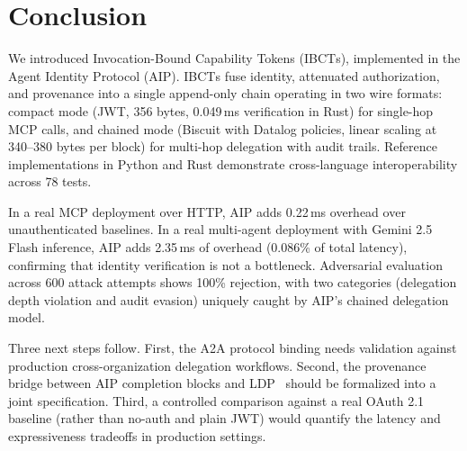 \documentclass[11pt,a4paper]{article}
\newcommand{\aip}{\textsc{AIP}}
\newcommand{\ibct}{\textsc{IBCT}}
\newcommand{\ldp}{\textsc{LDP}}
\newcommand{\atoa}{\textsc{A2A}}
\newcommand{\mcp}{\textsc{MCP}}
\begin{document}
\section{Conclusion}
\label{sec:conclusion}

We introduced Invocation-Bound Capability Tokens (\ibct{}s), implemented in the Agent Identity Protocol (\aip{}). \ibct{}s fuse identity, attenuated authorization, and provenance into a single append-only chain operating in two wire formats: compact mode (JWT, 356 bytes, 0.049\,ms verification in Rust) for single-hop \mcp{} calls, and chained mode (Biscuit with Datalog policies, linear scaling at 340--380 bytes per block) for multi-hop delegation with audit trails. Reference implementations in Python and Rust demonstrate cross-language interoperability across 78 tests.

In a real MCP deployment over HTTP, \aip{} adds 0.22\,ms overhead over unauthenticated baselines. In a real multi-agent deployment with Gemini 2.5 Flash inference, \aip{} adds 2.35\,ms of overhead (0.086\% of total latency), confirming that identity verification is not a bottleneck. Adversarial evaluation across 600 attack attempts shows 100\% rejection, with two categories (delegation depth violation and audit evasion) uniquely caught by \aip{}'s chained delegation model.

Three next steps follow. First, the \atoa{} protocol binding needs validation against production cross-organization delegation workflows. Second, the provenance bridge between \aip{} completion blocks and \ldp{}~\citep{prakash2025ldp} should be formalized into a joint specification. Third, a controlled comparison against a real OAuth 2.1 baseline (rather than no-auth and plain JWT) would quantify the latency and expressiveness tradeoffs in production settings.



\end{document}
